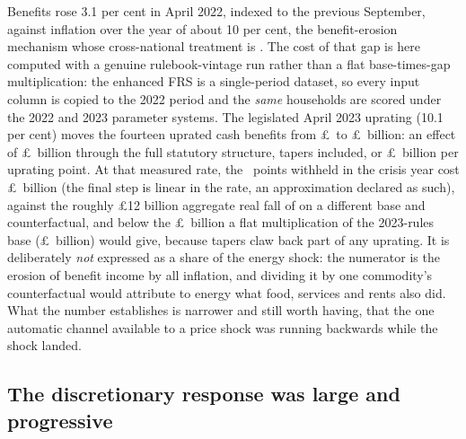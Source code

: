 Benefits rose 3.1 per cent in April 2022, indexed to the previous
September, against inflation over the year of about 10 per cent, the
benefit-erosion mechanism whose cross-national treatment is
\citet{paulus2020}. The
cost of that gap is here computed with a genuine rulebook-vintage
run rather than a flat base-times-gap multiplication: the enhanced
FRS is a single-period dataset, so every input column is copied to
the 2022 period and the \emph{same} households are scored under the
2022 and 2023 parameter systems. The legislated April 2023 uprating
(10.1 per cent) moves the fourteen uprated cash benefits from
\pounds\SsVinBenefitBaseRuleTwentyTwo\ to
\pounds\SsVinBenefitBaseRuleTwentyThree\ billion: an effect of
\pounds\SsVinUpratingEffectBn\ billion through the full statutory
structure, tapers included, or \pounds\SsVinPerPointBn\ billion per
uprating point. At that measured rate, the \SsUpratingGapPp\ points
withheld in the crisis year cost
\pounds\SsVinLagCostBn\ billion (the final step is linear in the
rate, an approximation declared as such), against the roughly
\pounds 12 billion aggregate real fall of \citet{obrwelfare2022} on a
different base and counterfactual, and below the
\pounds\SsUpratingShortfallBn\ billion a flat multiplication of the
2023-rules base (\pounds\SsBenefitIncomeBn\ billion) would give,
because tapers claw back part of any uprating.
It is deliberately \emph{not} expressed as a share of the energy
shock: the numerator is the erosion of benefit income by all inflation,
and dividing it by one commodity's counterfactual would attribute to
energy what food, services and rents also did. What the number
establishes is narrower and still worth having, that the one automatic
channel available to a price shock was running backwards while the
shock landed.

\subsection{The discretionary response was large and progressive}

